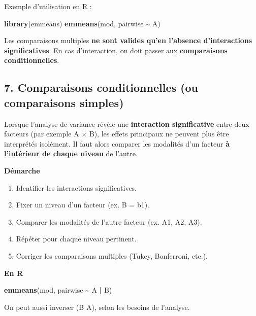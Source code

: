 \documentclass[
]{article}
\newenvironment{Shaded}{\begin{snugshade}}{\end{snugshade}}
\newcommand{\FunctionTok}[1]{\textcolor[rgb]{0.13,0.29,0.53}{\textbf{#1}}}
\newcommand{\NormalTok}[1]{#1}
\newcommand{\SpecialCharTok}[1]{\textcolor[rgb]{0.81,0.36,0.00}{\textbf{#1}}}
\providecommand{\tightlist}{%
  \setlength{\itemsep}{0pt}\setlength{\parskip}{0pt}}
\begin{document}
Exemple d'utilisation en R :

\begin{Shaded}
\begin{Highlighting}[]
\FunctionTok{library}\NormalTok{(emmeans)}
\FunctionTok{emmeans}\NormalTok{(mod, pairwise }\SpecialCharTok{\textasciitilde{}}\NormalTok{ A)}
\end{Highlighting}
\end{Shaded}

Les comparaisons multiples \textbf{ne sont valides qu'en l'absence
d'interactions significatives}. En cas d'interaction, on doit passer aux
\textbf{comparaisons conditionnelles}.

\subsection{7. Comparaisons conditionnelles (ou comparaisons
simples)}\label{comparaisons-conditionnelles-ou-comparaisons-simples}

Lorsque l'analyse de variance révèle une \textbf{interaction
significative} entre deux facteurs (par exemple A × B), les effets
principaux ne peuvent plus être interprétés isolément. Il faut alors
comparer les modalités d'un facteur \textbf{à l'intérieur de chaque
niveau} de l'autre.

\textbf{Démarche}

\begin{enumerate}
\def\labelenumi{\arabic{enumi}.}
\tightlist
\item
  Identifier les interactions significatives.
\item
  Fixer un niveau d'un facteur (ex. B = b1).
\item
  Comparer les modalités de l'autre facteur (ex. A1, A2, A3).
\item
  Répéter pour chaque niveau pertinent.
\item
  Corriger les comparaisons multiples (Tukey, Bonferroni, etc.).
\end{enumerate}

\textbf{En R}

\begin{Shaded}
\begin{Highlighting}[]
\FunctionTok{emmeans}\NormalTok{(mod, pairwise }\SpecialCharTok{\textasciitilde{}}\NormalTok{ A }\SpecialCharTok{|}\NormalTok{ B)}
\end{Highlighting}
\end{Shaded}

On peut aussi inverser (B \textbar{} A), selon les besoins de l'analyse.
\end{document}
